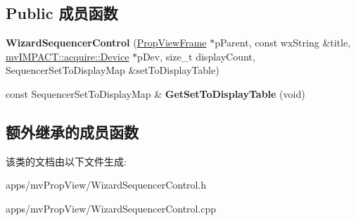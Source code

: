 \subsection*{Public 成员函数}
\begin{DoxyCompactItemize}
\item 
\hypertarget{class_wizard_sequencer_control_acc7d2283b40fa8faeda9859233a43a3c}{{\bfseries Wizard\+Sequencer\+Control} (\hyperlink{class_prop_view_frame}{Prop\+View\+Frame} $\ast$p\+Parent, const wx\+String \&title, \hyperlink{classmv_i_m_p_a_c_t_1_1acquire_1_1_device}{mv\+I\+M\+P\+A\+C\+T\+::acquire\+::\+Device} $\ast$p\+Dev, size\+\_\+t display\+Count, Sequencer\+Set\+To\+Display\+Map \&set\+To\+Display\+Table)}\label{class_wizard_sequencer_control_acc7d2283b40fa8faeda9859233a43a3c}

\item 
\hypertarget{class_wizard_sequencer_control_a625628fcf03013cb2084e1aff5181f03}{const Sequencer\+Set\+To\+Display\+Map \& {\bfseries Get\+Set\+To\+Display\+Table} (void)}\label{class_wizard_sequencer_control_a625628fcf03013cb2084e1aff5181f03}

\end{DoxyCompactItemize}
\subsection*{额外继承的成员函数}


该类的文档由以下文件生成\+:\begin{DoxyCompactItemize}
\item 
apps/mv\+Prop\+View/Wizard\+Sequencer\+Control.\+h\item 
apps/mv\+Prop\+View/Wizard\+Sequencer\+Control.\+cpp\end{DoxyCompactItemize}
